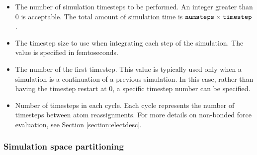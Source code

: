 \begin{itemize}
\item
{}
{\label{param:numsteps}
The number of simulation timesteps to be performed.  
An integer greater than 0 is acceptable.  
The total amount of simulation 
time is $\mbox{{\tt numsteps}} \times \mbox{{\tt timestep}}$.}

\item
{}
{The timestep size to use when integrating each step of the simulation.  
The value is specified in femtoseconds.}

\item
{}
{The number of the first timestep.  This value is typically used only 
when a simulation is a continuation of a previous simulation.  In this 
case, rather than having the timestep restart at 0, a specific timestep 
number can be specified.}

\item
{}
{Number of timesteps in each cycle.  Each cycle represents the number 
of timesteps between atom reassignments.
For more details on non-bonded force evaluation, see
Section \ref{section:electdesc}.}


\end{itemize}

\subsubsection{Simulation space partitioning}

